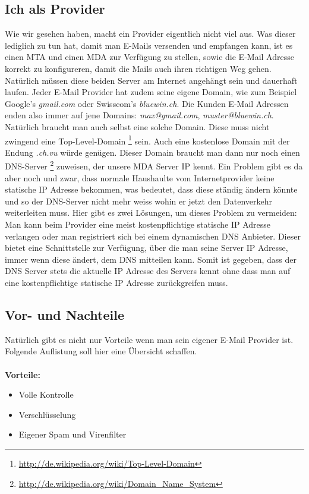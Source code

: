 \subsection{Ich als Provider}
Wie wir gesehen haben, macht ein Provider eigentlich nicht viel aus. Was dieser lediglich zu tun hat, damit man E-Mails versenden und empfangen kann, ist es einen MTA und einen MDA zur Verfügung zu stellen, sowie die E-Mail Adresse korrekt zu konfigureren, damit die Mails auch ihren richtigen Weg gehen. Natürlich müssen diese beiden Server am Internet angehängt sein und dauerhaft laufen.
Jeder E-Mail Provider hat zudem seine eigene Domain, wie zum Beispiel Google's \textit{gmail.com} oder Swisscom's \textit{bluewin.ch}. Die Kunden E-Mail Adressen enden also immer auf jene Domains: \textit{max@gmail.com}, \textit{muster@bluewin.ch}. Natürlich braucht man auch selbst eine solche Domain. Diese muss nicht zwingend eine Top-Level-Domain \footnote{\url{http://de.wikipedia.org/wiki/Top-Level-Domain}} sein. Auch eine kostenlose Domain mit der Endung \textit{.ch.vu} würde genügen. Dieser Domain braucht man dann nur noch einen DNS-Server \footnote{\url{http://de.wikipedia.org/wiki/Domain\_Name\_System}} zuweisen, der unsere MDA Server IP kennt. Ein Problem gibt es da aber noch und zwar, dass normale Haushaulte vom Internetprovider keine statische IP Adresse bekommen, was bedeutet, dass diese ständig ändern könnte und so der DNS-Server nicht mehr weiss wohin er jetzt den Datenverkehr weiterleiten muss. Hier gibt es zwei Lösungen, um dieses Problem zu vermeiden: Man kann beim Provider eine meist kostenpflichtige statische IP Adresse verlangen oder man registriert sich bei einem dynamischen DNS Anbieter. Dieser bietet eine Schnittstelle zur Verfügung, über die man seine Server IP Adresse, immer wenn diese ändert, dem DNS mitteilen kann. Somit ist gegeben, dass der DNS Server stets die aktuelle IP Adresse des Servers kennt ohne dass man auf eine kostenpflichtige statische IP Adresse zurückgreifen muss.

\subsection{Vor- und Nachteile}
Natürlich gibt es nicht nur Vorteile wenn man sein eigener E-Mail Provider ist. Folgende Auflistung soll hier eine Übersicht schaffen. \\ \\

\textbf{Vorteile:}
\begin{itemize}
    \item Volle Kontrolle
    \item Verschlüsselung
    \item Eigener Spam und Virenfilter
\end{itemize}

